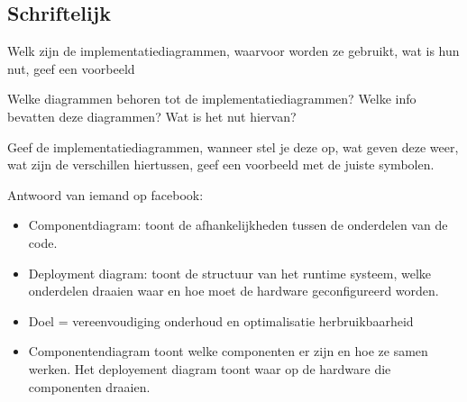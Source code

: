 \subsection{Schriftelijk}

\begin{question}
Welk zijn de implementatiediagrammen, waarvoor worden ze gebruikt, wat is hun nut, geef een voorbeeld
\end{question}

\begin{solution}[print]



\end{solution}
\begin{question}
Welke diagrammen behoren tot de implementatiediagrammen? Welke info bevatten deze diagrammen? Wat is het nut hiervan?
\end{question}

\begin{solution}[print]

\end{solution}

\begin{question}
Geef de implementatiediagrammen, wanneer stel je deze op, wat geven deze weer, wat zijn de verschillen hiertussen, geef een voorbeeld met de juiste symbolen.
\end{question}

\begin{solution}[print]
Antwoord van iemand op facebook:

\begin{itemize}
\bfsp
    \item Componentdiagram: toont de afhankelijkheden tussen de onderdelen van de code.
    \item Deployment diagram: toont de structuur van het runtime systeem, welke onderdelen draaien waar en hoe moet de hardware geconfigureerd worden.
    \item Doel = vereenvoudiging onderhoud en optimalisatie herbruikbaarheid
    \item Componentendiagram toont welke componenten er zijn en hoe ze samen werken. Het deployement diagram toont waar op de hardware die componenten draaien.
\end{itemize}


\end{solution}

